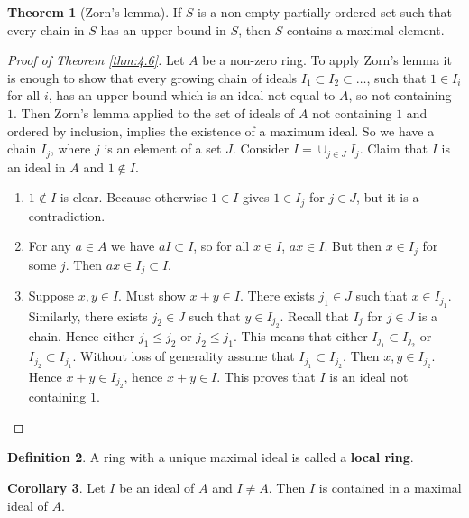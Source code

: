 \documentclass{article}
\theoremstyle{definition}\newtheorem{definition}{Definition}[section]
\theoremstyle{definition}\newtheorem{remark}[definition]{Remark}
\theoremstyle{definition}\newtheorem*{example}{Example}
\theoremstyle{definition}\newtheorem*{note}{Note}
\newtheorem{theorem}[definition]{Theorem}
\newtheorem{corollary}[definition]{Corollary}
\begin{document}
\begin{theorem}[Zorn's lemma]
If $ S $ is a non-empty partially ordered set such that every chain in $ S $ has an upper bound in $ S $, then $ S $ contains a maximal element.
\end{theorem}

\begin{proof}[Proof of Theorem \ref{thm:4.6}]
Let $ A $ be a non-zero ring. To apply Zorn's lemma it is enough to show that every growing chain of ideals $ I_1 \subset I_2 \subset \dots $, such that $ 1 \in I_i $ for all $ i $, has an upper bound which is an ideal not equal to $ A $, so not containing $ 1 $. Then Zorn's lemma applied to the set of ideals of $ A $ not containing $ 1 $ and ordered by inclusion, implies the existence of a maximum ideal. So we have a chain $ I_j $, where $ j $ is an element of a set $ J $. Consider $ I = \cup_{j \in J} I_j $. Claim that $ I $ is an ideal in $ A $ and $ 1 \notin I $.
\begin{enumerate}
\item $ 1 \notin I $ is clear. Because otherwise $ 1 \in I $ gives $ 1 \in I_j $ for $ j \in J $, but it is a contradiction.
\item For any $ a \in A $ we have $ aI \subset I $, so for all $ x \in I $, $ ax \in I $. But then $ x \in I_j $ for some $ j $. Then $ ax \in I_j \subset I $.
\item Suppose $ x, y \in I $. Must show $ x + y \in I $. There exists $ j_1 \in J $ such that $ x \in I_{j_1} $. Similarly, there exists $ j_2 \in J $ such that $ y \in I_{j_2} $. Recall that $ I_j $ for $ j \in J $ is a chain. Hence either $ j_1 \le j_2 $ or $ j_2 \le j_1 $. This means that either $ I_{j_1} \subset I_{j_2} $ or $ I_{j_2} \subset I_{j_1} $. Without loss of generality assume that $ I_{j_1} \subset I_{j_2} $. Then $ x, y \in I_{j_2} $. Hence $ x + y \in I_{j_2} $, hence $ x + y \in I $. This proves that $ I $ is an ideal not containing $ 1 $.
\end{enumerate}
\end{proof}

\begin{definition}
A ring with a unique maximal ideal is called a \textbf{local ring}.
\end{definition}

\begin{corollary}
\label{cor:4.9}
Let $ I $ be an ideal of $ A $ and $ I \ne A $. Then $ I $ is contained in a maximal ideal of $ A $.
\end{corollary}
\end{document}
